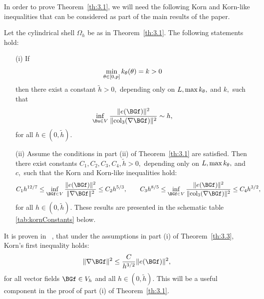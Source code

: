 In order to prove Theorem~\ref{th:3.1}, we will need the following Korn and Korn-like inequalities that can be considered as part of the main results of the paper. 

\begin{theorem}
\label{th:3.3}
Let the cylindrical shell $\Omega_h$ be as in Theorem~\ref{th:3.1}. 
The following statements hold:
\begin{itemize}
\item[(i)] If 
$$\min_{\theta\in[0,p]}k_\theta(\theta)=k>0$$
then there exist a constant $\tilde h>0,$ depending only on $L, \max k_\theta,$ and $k,$ such that
\begin{equation}
\label{3.5}
\inf_{\Bu\in V}\frac{\|e(\BGf)\|^2}{\|\mathrm{col}_3(\nabla\BGf)\|^2}\sim h,
\end{equation}
for all $h\in (0,\tilde h).$
\item[(ii)] Assume the conditions in part (ii) of Theorem~\ref{th:3.1} are satisfied. Then there exist constants $C_1,C_2,C_3,C_4,\tilde h>0,$ depending only on 
$L,\max k_\theta,$ and $c,$ such that the Korn and Korn-like inequalities hold:
\begin{equation}
\label{3.7}
C_1h^{12/7}\leq \inf_{\BGf\in V}\frac{\|e(\BGf)\|^2}{\|\nabla \BGf\|^2}\leq C_2h^{5/3},\quad 
\quad  C_3h^{8/5}\leq \inf_{\BGf\in V}\frac{\|e(\BGf)\|^2}{\|\mathrm{col}_3(\nabla\BGf)\|^2}\leq C_4h^{3/2},
\end{equation}
for all $h\in (0,\tilde h).$ These results are presented in the schematic table \ref{tab:kornConstants} below.
\end{itemize}

\end{theorem}

\begin{remark}
\label{rem:3.4}
It is proven in ~\cite[Theorem~3.2]{bib:Gra.Har.4}, that under the assumptions in part (i) of Theorem~\ref{th:3.3}, Korn's first inequality holds:
\begin{equation}
\label{3.8}
\|\nabla\BGf\|^2\leq\frac{C}{h^{3/2}}\|e(\BGf)\|^2,
\end{equation}
for all vector fields $\BGf\in V_h$ and all $h\in (0,\tilde h).$ This will be a useful component in the proof of part (i) of Theorem~\ref{th:3.1}.
\end{remark}







